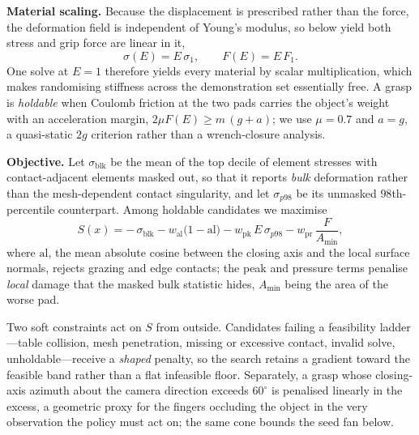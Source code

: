 \noindent\textbf{Material scaling.}
Because the displacement is prescribed rather than the force, the deformation field is
independent of Young's modulus, so below yield both stress and grip force are linear in it,
\begin{equation}
  \sigma(E) = E\,\sigma_1, \qquad F(E) = E\,F_1 .
  \label{eq:E-linear}
\end{equation}
One solve at $E\!=\!1$ therefore yields every material by scalar multiplication, which makes
randomising stiffness across the demonstration set essentially free. A grasp is
\emph{holdable} when Coulomb friction at the two pads carries the object's weight with an
acceleration margin, $2\mu F(E) \ge m\,(g+a)$; we use $\mu\!=\!0.7$ and $a\!=\!g$, a quasi-static
$2g$ criterion rather than a wrench-closure analysis.

\noindent\textbf{Objective.}
Let $\sigma_{\mathrm{blk}}$ be the mean of the top decile of element stresses with
contact-adjacent elements masked out, so that it reports \emph{bulk} deformation rather than the
mesh-dependent contact singularity, and let $\sigma_{p98}$ be its unmasked $98$th-percentile
counterpart. Among holdable candidates we maximise
\begin{equation}
  S(x) = -\,\sigma_{\mathrm{blk}}
         - w_{\mathrm{al}}\bigl(1-\mathrm{al}\bigr)
         - w_{\mathrm{pk}}\,E\,\sigma_{p98}
         - w_{\mathrm{pr}}\,\frac{F}{A_{\min}},
  \label{eq:score}
\end{equation}
where $\mathrm{al}$, the mean absolute cosine between the closing axis and the local surface
normals, rejects grazing and edge contacts; the peak and pressure terms penalise \emph{local}
damage that the masked bulk statistic hides, $A_{\min}$ being the area of the worse pad.

Two soft constraints act on $S$ from outside. Candidates failing a feasibility
ladder---table collision, mesh penetration, missing or excessive contact, invalid solve,
unholdable---receive a \emph{shaped} penalty, so the search retains a gradient toward the
feasible band rather than a flat infeasible floor. Separately, a grasp whose closing-axis
azimuth about the camera direction exceeds $60^\circ$ is penalised linearly in the excess, a
geometric proxy for the fingers occluding the object in the very observation the policy must
act on; the same cone bounds the seed fan below.


